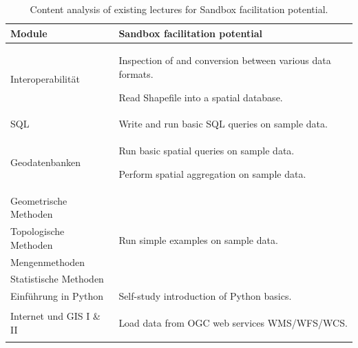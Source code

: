 \documentclass[11pt, a4paper, oneside, parskip=full-]{scrartcl}
\begin{document}
\begin{table}[!htbp]
  \centering
  \caption{Content analysis of existing lectures for Sandbox facilitation potential.}
  \label{tab:tContentAnalysis}
  \begin{tabularx}{\textwidth}{lX}
    \toprule
    \textbf{Module} & \textbf{Sandbox facilitation potential} \\
    \midrule
    Interoperabilität &
      \begin{itemize}[left=0pt,nosep,before={\begin{minipage}[t]{\hsize}},after
      ={\end{minipage}}]
      \item Inspection of and conversion between various data formats.
      \item Read Shapefile into a spatial database.
      \end{itemize}\nointerlineskip\\
    \midrule
    SQL & Write and run basic SQL queries on sample data. \\
    \midrule
    Geodatenbanken &
    \begin{itemize}[left=0pt,nosep,before={\begin{minipage}[t]{\hsize}},after
    ={\end{minipage}}]
      \item Run basic spatial queries on sample data.
      \item Perform spatial aggregation on sample data.
      \end{itemize}\nointerlineskip\\
    \midrule
    Geometrische Methoden & \multirow[t]{4}{*}{Run simple examples on sample
    data.} \\
    \cmidrule(r){1-1} Topologische Methoden &  \\
    \cmidrule(r){1-1} Mengenmethoden &  \\
    \cmidrule(r){1-1} Statistische Methoden &  \\
    \midrule
    Einführung in Python & Self-study introduction of Python basics. \\
    \midrule
    Internet und GIS I \& II &
      \begin{itemize}[left=0pt,nosep,before={\begin{minipage}[t]{\hsize}},after
      ={\end{minipage}}]
      \item Load data from OGC web services WMS/WFS/WCS.

\end{itemize}
\end{tabularx}
\end{table}
\end{document}
